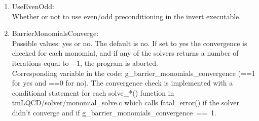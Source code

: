 \begin{enumerate}
\item {\ttfamily UseEvenOdd}:\\
  Whether or not to use even/odd preconditioning in the invert
  executable.

\item  {\ttfamily BarrierMonomialsConverge}:\\
  Possible values:  {\ttfamily yes} or  {\ttfamily no}. The default is  {\ttfamily no}. 
  If set to  {\ttfamily yes} the convergence is checked for each monomial, 
  and if any of the solvers returns a number of iterations equal to $-1$, 
  the program is aborted.\\
  Corresponding variable in the code: {\ttfamily g\_barrier\_monomials\_convergence} 
  ({\ttfamily==1} for  {\ttfamily yes} 
  and  {\ttfamily ==0} for  {\ttfamily no}).
  The convergence check is implemented with a conditional statement for each {\ttfamily solve\_*()} 
  function in {\ttfamily tmLQCD/solver/monomial\_solve.c} which calls {\ttfamily fatal\_error()} 
  if the solver didn't converge and if \mbox{\ttfamily g\_barrier\_monomials\_convergence \ttfamily == 1}.
\end{enumerate}


